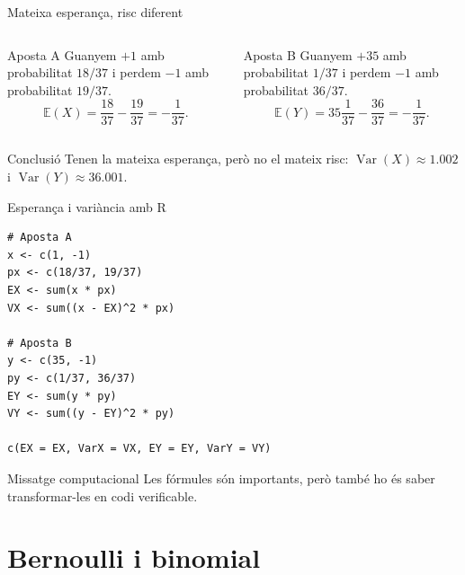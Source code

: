 \documentclass[10pt,aspectratio=169]{beamer}
\newcommand{\E}{\mathbb{E}}
\newcommand{\Var}{\operatorname{Var}}
\begin{document}
\begin{frame}{Mateixa esperança, risc diferent}
\begin{columns}[T]
\begin{block}{Aposta A}
Guanyem $+1$ amb probabilitat $18/37$ i perdem $-1$ amb probabilitat $19/37$.
\[
\E(X)=\frac{18}{37}-\frac{19}{37}=-\frac{1}{37}.
\]
\end{block}
\begin{block}{Aposta B}
Guanyem $+35$ amb probabilitat $1/37$ i perdem $-1$ amb probabilitat $36/37$.
\[
\E(Y)=35\frac{1}{37}-\frac{36}{37}=-\frac{1}{37}.
\]
\end{block}
\end{columns}
\vspace{0.2cm}
\begin{alertblock}{Conclusió}
Tenen la mateixa esperança, però no el mateix risc: $\Var(X)\approx 1.002$ i $\Var(Y)\approx 36.001$.
\end{alertblock}
\end{frame}

\begin{frame}[fragile]{Esperança i variància amb R}
\begin{lstlisting}
# Aposta A
x <- c(1, -1)
px <- c(18/37, 19/37)
EX <- sum(x * px)
VX <- sum((x - EX)^2 * px)

# Aposta B
y <- c(35, -1)
py <- c(1/37, 36/37)
EY <- sum(y * py)
VY <- sum((y - EY)^2 * py)

c(EX = EX, VarX = VX, EY = EY, VarY = VY)
\end{lstlisting}

\begin{block}{Missatge computacional}
Les fórmules són importants, però també ho és saber transformar-les en codi verificable.
\end{block}
\end{frame}

\section{Bernoulli i binomial}
\end{document}
